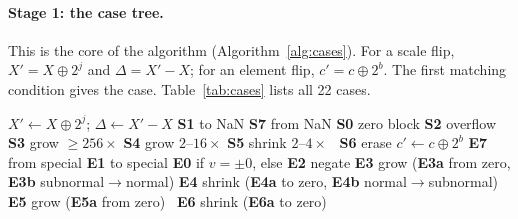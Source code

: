 \documentclass[12pt,a4paper]{article}
\begin{document}
\paragraph{Stage 1: the case tree.} This is the core of the algorithm (Algorithm~\ref{alg:cases}).
For a scale flip, $X' = X \oplus 2^j$ and $\Delta = X'-X$; for an element flip, $c' = c\oplus
2^b$. The first matching condition gives the case. Table~\ref{tab:cases} lists all 22 cases.

\begin{algorithm}[H]
\caption{Stage 1: the case of one single-bit flip}
\label{alg:cases}
\begin{algorithmic}[1]
\small
{}
    \State $X' \gets X \oplus 2^j$; \quad $\Delta \gets X' - X$ 
     \Return \textbf{S1} to NaN
     \Return \textbf{S7} from NaN
     \Return \textbf{S0} zero block
     \Return \textbf{S2} overflow
     \Return \textbf{S3} grow $\ge 256\times$
     \Return \textbf{S4} grow $2$--$16\times$
     \Return \textbf{S5} shrink $2$--$4\times$
    \Else\ \Return \textbf{S6} erase
    \EndIf
\Else {}
    \State $c' \gets c \oplus 2^b$
     \Return \textbf{E7} from special
     \Return \textbf{E1} to special
     \Return \textbf{E0} if $v = \pm 0$, else \textbf{E2} negate
     \Return \textbf{E3} grow (\textbf{E3a} from zero, \textbf{E3b} subnormal$\to$normal)
     \Return \textbf{E4} shrink (\textbf{E4a} to zero, \textbf{E4b} normal$\to$subnormal)
     \Return \textbf{E5} grow (\textbf{E5a} from zero)
    \Else\ \Return \textbf{E6} shrink (\textbf{E6a} to zero)
    \EndIf
\EndIf
\end{algorithmic}
\end{algorithm}
\end{document}
